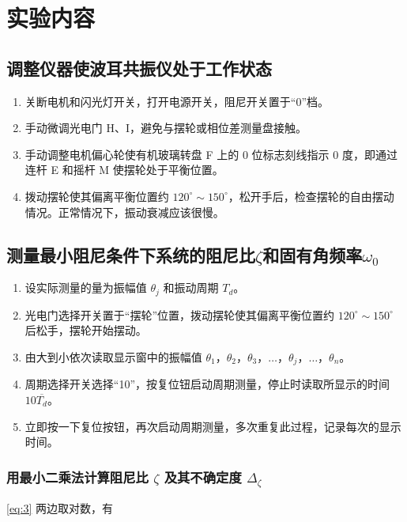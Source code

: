 \documentclass[12pt,a4paper]{amsart}
\begin{document}
\section{实验内容}

\subsection{调整仪器使波耳共振仪处于工作状态}

\begin{enumerate}
	\item 关断电机和闪光灯开关，打开电源开关，阻尼开关置于“0”档。
	\item 手动微调光电门 H、I，避免与摆轮或相位差测量盘接触。
	\item 手动调整电机偏心轮使有机玻璃转盘 F 上的 0 位标志刻线指示 0 度，即通过连杆 E 和摇杆 M 使摆轮处于平衡位置。
	\item 拨动摆轮使其偏离平衡位置约 $120^\circ\sim 150^\circ$，松开手后，检查摆轮的自由摆动情况。正常情况下，振动衰减应该很慢。
    
\end{enumerate}

\subsection{测量最小阻尼条件下系统的阻尼比$\zeta$和固有角频率$\omega_0$}
\begin{enumerate}
    \item 设实际测量的量为振幅值 $\theta_j$ 和振动周期 $T_d$。
	\item 光电门选择开关置于“摆轮”位置，拨动摆轮使其偏离平衡位置约 $120^\circ\sim 150^\circ$ 后松手，摆轮开始摆动。
    \item 由大到小依次读取显示窗中的振幅值 $\theta_1$，$\theta_2$，$\theta_3$，$\dots$，$\theta_j$，$\dots$，$\theta_n$。
    \item 周期选择开关选择“10”，按复位钮启动周期测量，停止时读取所显示的时间 $10\overline{T_d}$。
    \item 立即按一下复位按钮，再次启动周期测量，多次重复此过程，记录每次的显示时间。
\end{enumerate}

\subsubsection{用最小二乘法计算阻尼比 $\zeta$ 及其不确定度 $\Delta_\zeta$}

\ref{eq:3} 两边取对数，有
\end{document}
